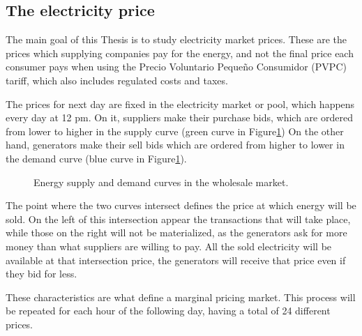 \subsection{The electricity price}
The main goal of this Thesis is to study electricity market prices.
These are the prices which supplying companies pay for the energy, and not the final price each consumer pays when using the Precio Voluntario Pequeño Consumidor (PVPC) tariff, which also includes regulated costs and taxes. \cite{mercado-electrico-xataka}

The prices for next day are fixed in the electricity market or pool, which happens every day at 12 pm.
On it, suppliers make their purchase bids, which are ordered from lower to higher in the supply curve (green curve in Figure\ref{fig:supply-demand-curves})
On the other hand, generators make their sell bids which are ordered from higher to lower in the demand curve (blue curve in Figure\ref{fig:supply-demand-curves}).

\begin{figure}[H]
\centering
    \caption{Energy supply and demand curves in the wholesale market. \cite{curva-oferta-demanda}}
    \label{fig:supply-demand-curves}
\end{figure}

The point where the two curves intersect defines the price at which energy will be sold. On the left of this intersection appear the transactions that will take place, while those on the right will not be materialized, as the generators ask for more money than what suppliers are willing to pay.
All the sold electricity will be available at that intersection price, the generators will receive that price even if they bid for less.

These characteristics are what define a marginal pricing market.
This process will be repeated for each hour of the following day, having a total of 24 different prices.

